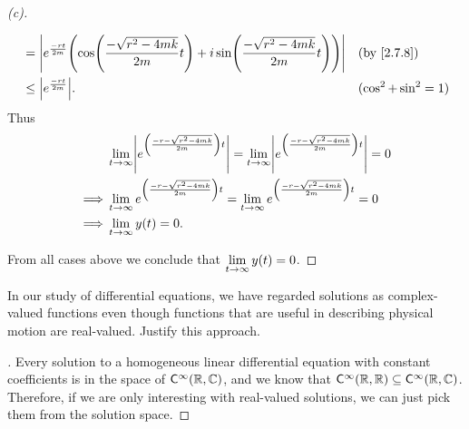 \begin{proof}[(c)]
\begin{itemize}
\begin{align*}
             & = \abs{e^{\frac{-rt}{2m}} \pa{\cos\pa{\frac{-\sqrt{r^2 - 4mk}}{2m} t} + i \sin\pa{\frac{-\sqrt{r^2 - 4mk}}{2m} t}}} &  & \by{2.7.8}            \\
             & \leq \abs{e^{\frac{-rt}{2m}}}.                                                                                      &  & (\cos^2 + \sin^2 = 1)
          \end{align*}
          Thus
          \begin{align*}
                     & \Lim_{t \to \infty} \abs{e^{\pa{\frac{-r - \sqrt{r^2 - 4mk}}{2m}} t}} = \Lim_{t \to \infty} \abs{e^{\pa{\frac{-r - \sqrt{r^2 - 4mk}}{2m}} t}} = 0 \\
            \implies & \Lim_{t \to \infty} e^{\pa{\frac{-r - \sqrt{r^2 - 4mk}}{2m}} t} = \Lim_{t \to \infty} e^{\pa{\frac{-r - \sqrt{r^2 - 4mk}}{2m}} t} = 0             \\
            \implies & \Lim_{t \to \infty} y(t) = 0.
          \end{align*}
  \end{itemize}
  From all cases above we conclude that \(\lim\limits_{t \to \infty} y(t) = 0\).
\end{proof}

\begin{ex}\label{ex:2.7.19}
  In our study of differential equations, we have regarded solutions as complex-valued functions even though functions that are useful in describing physical motion are real-valued.
  Justify this approach.
\end{ex}

\begin{proof}[]
  Every solution to a homogeneous linear differential equation with constant coefficients is in the space of \(\cfs[\infty](\R, \C)\), and we know that \(\cfs[\infty](\R, \R) \subseteq \cfs[\infty](\R, \C)\).
  Therefore, if we are only interesting with real-valued solutions, we can just pick them from the solution space.
\end{proof}
